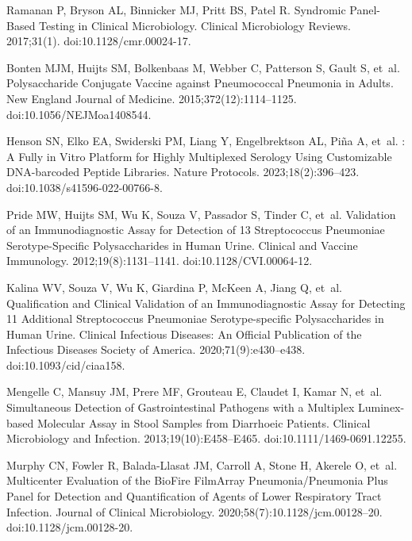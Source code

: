 \documentclass[10pt,letterpaper]{article}
\providecommand{\DIFdelend}{} %
\DeclareRobustCommand{\DIFdelend}{\DIFOaddend \let\includegraphics\DIFOincludegraphics} %
\begin{document}
\DIFdelend \nolinenumbers

% 
\begin{thebibliography}{10}

Ramanan P, Bryson AL, Binnicker MJ, Pritt BS, Patel R.
\newblock Syndromic {{Panel-Based Testing}} in {{Clinical Microbiology}}.
\newblock Clinical Microbiology Reviews. 2017;31(1).
\newblock doi:{10.1128/cmr.00024-17}.

Bonten MJM, Huijts SM, Bolkenbaas M, Webber C, Patterson S, Gault S, et~al.
\newblock Polysaccharide {{Conjugate Vaccine}} against {{Pneumococcal
  Pneumonia}} in {{Adults}}.
\newblock New England Journal of Medicine. 2015;372(12):1114--1125.
\newblock doi:{10.1056/NEJMoa1408544}.

Henson SN, Elko EA, Swiderski PM, Liang Y, Engelbrektson AL, Piña A, et~al.
: A Fully in Vitro Platform for Highly Multiplexed Serology
  Using Customizable {{DNA-barcoded}} Peptide Libraries.
\newblock Nature Protocols. 2023;18(2):396--423.
\newblock doi:{10.1038/s41596-022-00766-8}.

Pride MW, Huijts SM, Wu K, Souza V, Passador S, Tinder C, et~al.
\newblock Validation of an {{Immunodiagnostic Assay}} for {{Detection}} of 13
  {{Streptococcus}} Pneumoniae {{Serotype-Specific Polysaccharides}} in {{Human
  Urine}}.
\newblock Clinical and Vaccine Immunology. 2012;19(8):1131--1141.
\newblock doi:{10.1128/CVI.00064-12}.

Kalina WV, Souza V, Wu K, Giardina P, McKeen A, Jiang Q, et~al.
\newblock Qualification and {{Clinical Validation}} of an {{Immunodiagnostic
  Assay}} for {{Detecting}} 11 {{Additional Streptococcus}} Pneumoniae
  {{Serotype-specific Polysaccharides}} in {{Human Urine}}.
\newblock Clinical Infectious Diseases: An Official Publication of the
  Infectious Diseases Society of America. 2020;71(9):e430--e438.
\newblock doi:{10.1093/cid/ciaa158}.

Mengelle C, Mansuy JM, Prere MF, Grouteau E, Claudet I, Kamar N, et~al.
\newblock Simultaneous Detection of Gastrointestinal Pathogens with a Multiplex
  {{Luminex-based}} Molecular Assay in Stool Samples from Diarrhoeic Patients.
\newblock Clinical Microbiology and Infection. 2013;19(10):E458--E465.
\newblock doi:{10.1111/1469-0691.12255}.

Murphy CN, Fowler R, {Balada-Llasat} JM, Carroll A, Stone H, Akerele O, et~al.
\newblock Multicenter {{Evaluation}} of the {{BioFire FilmArray
  Pneumonia}}/{{Pneumonia Plus Panel}} for {{Detection}} and {{Quantification}}
  of {{Agents}} of {{Lower Respiratory Tract Infection}}.
\newblock Journal of Clinical Microbiology. 2020;58(7):10.1128/jcm.00128--20.
\newblock doi:{10.1128/jcm.00128-20}.


\end{thebibliography}
\end{document}
